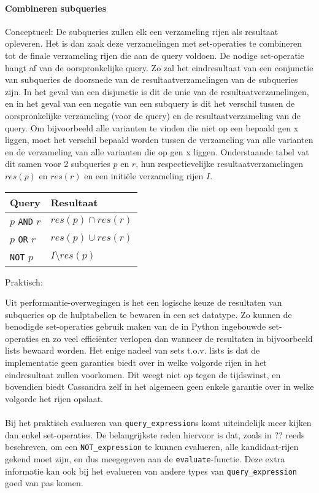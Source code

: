 \paragraph{Combineren subqueries}

Conceptueel:
De subqueries zullen elk een verzameling rijen als resultaat opleveren. Het is dan zaak deze verzamelingen met set-operaties te combineren tot de finale verzameling rijen die aan de query voldoen. De nodige set-operatie hangt af van de oorspronkelijke query. Zo zal het eindresultaat van een conjunctie van subqueries de doorsnede van de resultaatverzamelingen van de subqueries zijn. In het geval van een disjunctie is dit de unie van de resultaatverzamelingen, en in het geval van een negatie van een subquery is dit het verschil tussen de oorspronkelijke verzameling (voor de query) en de resultaatverzameling van de query. Om bijvoorbeeld alle varianten te vinden die niet op een bepaald gen x liggen, moet het verschil bepaald worden tussen de verzameling van alle varianten en de verzameling van alle varianten die op gen x liggen. Onderstaande tabel vat dit samen voor 2 subqueries $p$ en $r$, hun respectievelijke resultaatverzamelingen $res(p)$ en $res(r)$ en een initi\"ele verzameling rijen $I$.

\begin{table}[h]
\centering
\begin{tabular}{|l|l|}
\hline
\textbf{Query} & \textbf{Resultaat}    \\ \hline
$p$ \texttt{AND} $r$ & $res(p) \cap res(r)$   \\ \hline
$p$ \texttt{OR} $r$ & $res(p) \cup res(r)$    \\ \hline
\texttt{NOT} $p$  & $I \setminus res(p)$ \\ \hline
\end{tabular}
\end{table}

Praktisch:

Uit performantie-overwegingen is het een logische keuze de resultaten van subqueries op de hulptabellen te bewaren in een set datatype. Zo kunnen de benodigde set-operaties gebruik maken van de in Python ingebouwde set-operaties en zo veel effici\"enter verlopen dan wanneer de resultaten in bijvoorbeeld lists bewaard worden. Het enige nadeel van sets t.o.v. lists is dat de implementatie geen garanties biedt over in welke volgorde rijen in het eindresultaat zullen voorkomen. Dit weegt niet op tegen de tijdswinst, en bovendien biedt Cassandra zelf in het algemeen geen enkele garantie over in welke volgorde het rijen opslaat.\\\\
Bij het praktisch evalueren van \texttt{query\_expression}s komt uiteindelijk meer kijken dan enkel set-operaties. De belangrijkste reden hiervoor is dat, zoals in ?? %
reeds beschreven, om een \texttt{NOT\_expression} te kunnen evalueren, alle kandidaat-rijen gekend moet zijn, en dus meegegeven aan de \texttt{evaluate}-functie. Deze extra informatie kan ook bij het evalueren van andere types van \texttt{query\_expression} goed van pas komen.
 
